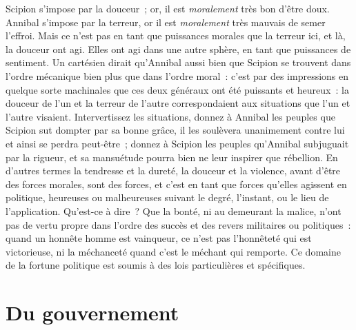\documentclass[french,twoside]{book} %
\begin{document}
\noindent Scipion s’impose par la douceur ; or, il est \emph{moralement} très bon d’être doux. Annibal s’impose par la terreur, or il est \emph{moralement} très mauvais de semer l’effroi. Mais ce n’est pas en tant que puissances morales que la terreur ici, et là, la douceur ont agi. Elles ont agi dans une autre sphère, en tant que puissances de sentiment. Un cartésien dirait qu’Annibal aussi bien que Scipion se trouvent dans l’ordre mécanique bien plus que dans l’ordre moral : c’est par des impressions en quelque sorte machinales que ces deux généraux ont été puissants et heureux : la douceur de l’un et la terreur de l’autre correspondaient aux situations que l’un et l’autre visaient. Intervertissez les situations, donnez à Annibal les peuples que Scipion sut dompter par sa bonne grâce, il les soulèvera unanimement contre lui et ainsi se perdra peut-être ; donnez à Scipion les peuples qu’Annibal subjuguait par la rigueur, et sa mansuétude pourra bien ne leur inspirer que rébellion. En d’autres termes la tendresse et la dureté, la douceur et la violence, avant d’être des forces morales, sont des forces, et c’est en tant que forces qu’elles agissent en politique, heureuses ou malheureuses suivant le degré, l’instant, ou le lieu de l’application. Qu’est-ce à dire ? Que la bonté, ni au demeurant la malice, n’ont pas de vertu propre dans l’ordre des succès et des revers militaires ou politiques : quand un honnête homme est vainqueur, ce n’est pas l’honnêteté qui est victorieuse, ni la méchanceté quand c’est le méchant qui remporte. Ce domaine de la fortune politique est soumis à des lois particulières et spécifiques.
\section[{Du gouvernement}]{Du gouvernement}
\end{document}
